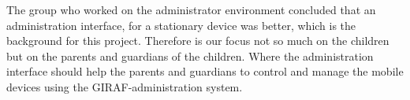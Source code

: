 The group who worked on the administrator environment concluded that an administration interface, for a stationary device was better, which is the background for this project.
Therefore is our focus not so much on the children but on the parents and guardians of the children. Where the administration interface should help the parents and guardians to control and manage the mobile devices using the GIRAF-administration system.
